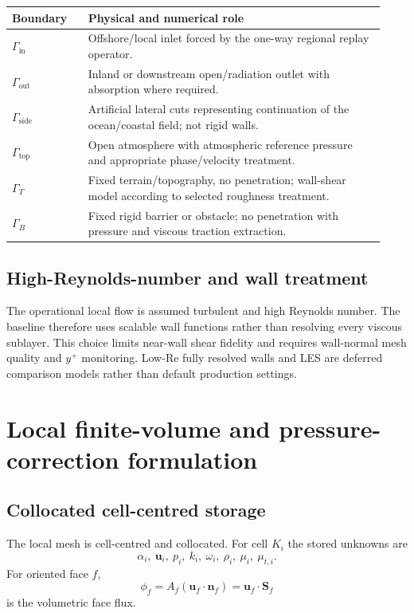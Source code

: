 \documentclass[11pt,a4paper]{article}
\newcommand{\vect}[1]{\bm{#1}}
\begin{document}
\begin{longtable}{p{0.19\linewidth}p{0.74\linewidth}}
\toprule
Boundary & Physical and numerical role\\
\midrule
$\Gamma_{\mathrm{in}}$ & Offshore/local inlet forced by the one-way regional replay operator.\\
$\Gamma_{\mathrm{out}}$ & Inland or downstream open/radiation outlet with absorption where required.\\
$\Gamma_{\mathrm{side}}$ & Artificial lateral cuts representing continuation of the ocean/coastal field; not rigid walls.\\
$\Gamma_{\mathrm{top}}$ & Open atmosphere with atmospheric reference pressure and appropriate phase/velocity treatment.\\
$\Gamma_T$ & Fixed terrain/topography, no penetration; wall-shear model according to selected roughness treatment.\\
$\Gamma_B$ & Fixed rigid barrier or obstacle; no penetration with pressure and viscous traction extraction.\\
\bottomrule
\end{longtable}

\subsection{High-Reynolds-number and wall treatment}

The operational local flow is assumed turbulent and high Reynolds number. The baseline therefore uses scalable wall functions rather than resolving every viscous sublayer. This choice limits near-wall shear fidelity and requires wall-normal mesh quality and $y^+$ monitoring. Low-Re fully resolved walls and LES are deferred comparison models rather than default production settings.

\section{Local finite-volume and pressure-correction formulation}

\subsection{Collocated cell-centred storage}

The local mesh is cell-centred and collocated. For cell $K_i$ the stored unknowns are
\begin{equation}
  \alpha_i,\ \vect u_i,\ p_i,\ k_i,\ \omega_i,\ \rho_i,\ \mu_i,\ \mu_{t,i}.
\end{equation}
For oriented face $f$,
\begin{equation}
  \phi_f=A_f(\vect u_f\cdot\vect n_f)
  =\vect u_f\cdot\vect S_f
\end{equation}
is the volumetric face flux.
\end{document}
